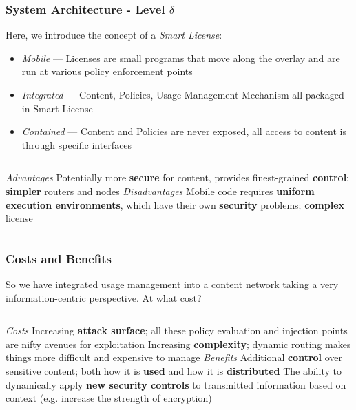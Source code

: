 \begin{frame}[t]
\frametitle{System Architecture - Level $\delta$}
Here, we introduce the concept of a \textit{Smart License}:
\begin{itemize}
\pause
\item \textit{Mobile} --- Licenses are small programs that move along the overlay and are run at various policy enforcement points \cite{proposal:rfc3198}
\pause
\item \textit{Integrated} --- Content, Policies, Usage Management Mechanism all packaged in Smart License
\pause
\item \textit{Contained} --- Content and Policies are never exposed, all access to content is through specific interfaces
\end{itemize}
\pause
\begin{columns}[t]
\textit{Advantages}
\pause
\newline
\newline
Potentially more \textbf{secure} for content, provides finest-grained \textbf{control}; \textbf{simpler} routers and nodes
\textit{Disadvantages}
\pause
\newline
\newline
Mobile code requires \textbf{uniform execution environments}, which have their own \textbf{security} problems; \textbf{complex} license
\end{columns}
\end{frame}

\begin{frame}
\frametitle{Costs and Benefits}
So we have integrated usage management into a content network taking a very information-centric perspective.  At what cost?
\newline
\pause
\begin{columns}[t]
\textit{Costs}
\pause
\newline
\newline
Increasing \textbf{attack surface}; all these policy evaluation and injection points are nifty avenues for exploitation
\pause
\newline
\newline
Increasing \textbf{complexity}; dynamic routing makes things more difficult and expensive to manage
\textit{Benefits}
\pause
\newline
\newline
Additional \textbf{control} over sensitive content; both how it is \textbf{used} and how it is \textbf{distributed}
\pause
\newline
\newline
The ability to dynamically apply \textbf{new security controls} to transmitted information based on context (e.g. increase the strength of encryption)
\end{columns}
\end{frame}